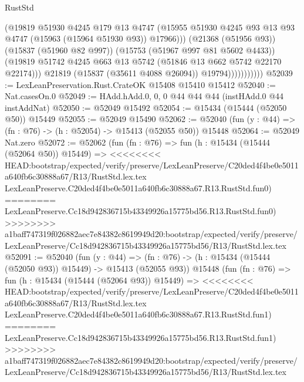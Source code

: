 \begin{lexlean}{RustStd}
\begin{coremodule}
{\begin{coremodule}
{{{{{{{{{{{{{{{{{{{{{{{{{{{{{{{{{{{{{{{{{{{{{{{{{{{{{{{{{{{{                              (@19819
                                @51930
                                @4245
                                @179
                                @13
                                @4747
                                (@15955
                                  @51930
                                  @4245
                                  @93
                                  @13
                                  @93
                                  @4747
                                  (@15963 (@15964 @51930 @93))
                                  @17966)))
                            (@21368 (@51956 @93))
                            (@15837 (@51960 @82 @997))
                            (@15753 (@51967 @997 @81 @5602 @4433))
                            (@19819
                              @51742
                              @4245
                              @663
                              @13
                              @5742
                              (@51846 @13 @662 @5742 @22170 @22174)))
                          @21819
                          (@15837 (@35611 @4088 @26094))
                          @19794)))))))))))
@52039 := LexLeanPreservation.Rust.CrateOK @15408 @15410 @15412
@52040 := Nat.casesOn.{0}
@52049 := HAdd.hAdd.{0, 0, 0} @44 @44 @44 (instHAdd.{0} @44 instAddNat)
@52050 := @52049 @15492
@52054 := @15434 (@15444 (@52050 @50)) @15449
@52055 := @52049 @15490
@52062 := @52040 (fun (y : @44) => (fn : @76) -> (h : @52054) -> @15413 (@52055 @50)) @15448
@52064 := @52049 Nat.zero
@52072 := @52062
    (fun (fn : @76) =>
    fun (h : @15434 (@15444 (@52064 @50)) @15449) =>
<<<<<<<< HEAD:bootstrap/expected/verify/preserve/LexLeanPreserve/C20ded4f4be0e5011a640fb6c30888a67/R13/RustStd.lex.tex
    LexLeanPreserve.C20ded4f4be0e5011a640fb6c30888a67.R13.RustStd.fun0)
========
    LexLeanPreserve.Cc18d942836715b43349926a15775bd56.R13.RustStd.fun0)
>>>>>>>> a1baff747319f026882aec7e84382c8619949d20:bootstrap/expected/verify/preserve/LexLeanPreserve/Cc18d942836715b43349926a15775bd56/R13/RustStd.lex.tex
@52091 := @52040
    (fun (y : @44) =>
    (fn : @76) -> (h : @15434 (@15444 (@52050 @93)) @15449) -> @15413 (@52055 @93))
    @15448
    (fun (fn : @76) =>
    fun (h : @15434 (@15444 (@52064 @93)) @15449) =>
<<<<<<<< HEAD:bootstrap/expected/verify/preserve/LexLeanPreserve/C20ded4f4be0e5011a640fb6c30888a67/R13/RustStd.lex.tex
    LexLeanPreserve.C20ded4f4be0e5011a640fb6c30888a67.R13.RustStd.fun1)
========
    LexLeanPreserve.Cc18d942836715b43349926a15775bd56.R13.RustStd.fun1)
>>>>>>>> a1baff747319f026882aec7e84382c8619949d20:bootstrap/expected/verify/preserve/LexLeanPreserve/Cc18d942836715b43349926a15775bd56/R13/RustStd.lex.tex
}}}}}}}}}}}}}}}}}}}}}}}}}}}}}}}}}}}}}}}}}}}}}}}}}}}}}}}}}}}}
\end{coremodule}}
\end{coremodule}
\end{lexlean}
